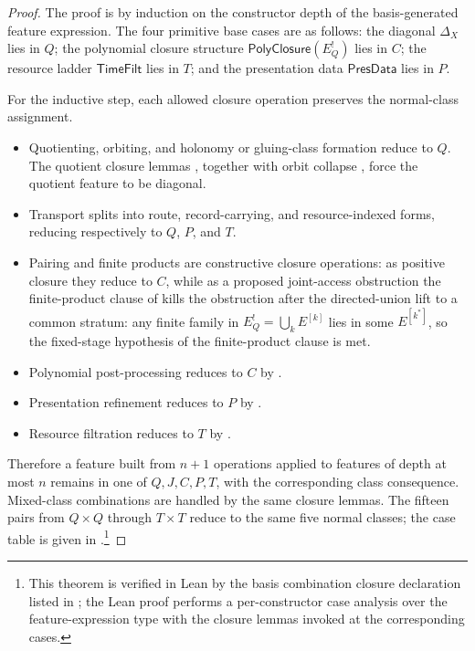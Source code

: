 \documentclass[11pt]{article}
\newcommand{\EQbang}{E^{!}_{Q}}
\theoremstyle{definition}
\begin{document}
\begin{proof}
The proof is by induction on the constructor depth of the
basis-generated feature expression.  The four primitive base cases are
as follows: the diagonal \(\Delta_X\) lies in \(Q\); the polynomial
closure structure \(\mathsf{PolyClosure}(\EQbang)\) lies in \(C\); the
resource ladder \(\mathsf{TimeFilt}\) lies in \(T\); and the
presentation data \(\mathsf{PresData}\) lies in \(P\).

For the inductive step, each allowed closure operation preserves the
normal-class assignment.
\begin{itemize}
\item Quotienting, orbiting, and holonomy or gluing-class formation
  reduce to \(Q\).  The quotient closure lemmas
  ,
  together with orbit collapse , force
  the quotient feature to be diagonal.
\item Transport splits into route, record-carrying, and
  resource-indexed forms, reducing respectively to \(Q\), \(P\), and
  \(T\).
\item Pairing and finite products are constructive closure operations:
  as positive closure they reduce to \(C\), while as a proposed
  joint-access obstruction the finite-product clause of
   kills the obstruction after
  the directed-union lift to a common stratum: any finite family in
  \(\EQbang=\bigcup_k E^{[k]}\) lies in some \(E^{[k^*]}\), so the
  fixed-stage hypothesis of the finite-product clause is met.
\item Polynomial post-processing reduces to \(C\) by
  .
\item Presentation refinement reduces to \(P\) by
  .
\item Resource filtration reduces to \(T\) by
  .
\end{itemize}

Therefore a feature built from \(n+1\) operations applied to features
of depth at most \(n\) remains in one of \(Q,J,C,P,T\), with the
corresponding class consequence.  Mixed-class combinations are handled
by the same closure lemmas.  The fifteen pairs from \(Q\times Q\)
through \(T\times T\) reduce to the same five normal classes; the case
table is given in .\footnote{This
theorem is verified in Lean by the basis combination closure
declaration listed in ; the Lean proof performs
a per-constructor case analysis over the feature-expression type with
the closure lemmas invoked at the corresponding cases.}
\end{proof}
\end{document}
